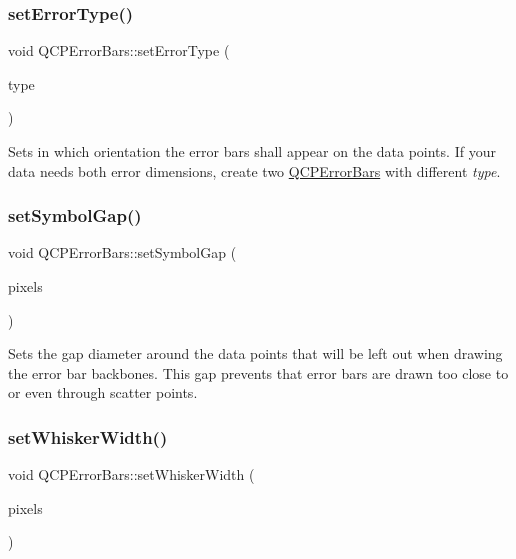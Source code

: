 \subsubsection{\texorpdfstring{set\+Error\+Type()}{setErrorType()}}
{\footnotesize\ttfamily void Q\+C\+P\+Error\+Bars\+::set\+Error\+Type (\begin{DoxyParamCaption}\item[{\hyperlink{class_q_c_p_error_bars_a95f0220f11a72648b96480a85ce26474}{Error\+Type}}]{type }\end{DoxyParamCaption})}

Sets in which orientation the error bars shall appear on the data points. If your data needs both error dimensions, create two \hyperlink{class_q_c_p_error_bars}{Q\+C\+P\+Error\+Bars} with different {\itshape type}. \mbox{\label{class_q_c_p_error_bars_a280ee8d863d8a2630c309701d019b3de}} 
\subsubsection{\texorpdfstring{set\+Symbol\+Gap()}{setSymbolGap()}}
{\footnotesize\ttfamily void Q\+C\+P\+Error\+Bars\+::set\+Symbol\+Gap (\begin{DoxyParamCaption}\item[{double}]{pixels }\end{DoxyParamCaption})}

Sets the gap diameter around the data points that will be left out when drawing the error bar backbones. This gap prevents that error bars are drawn too close to or even through scatter points. \mbox{\label{class_q_c_p_error_bars_ad05f6ff9e46c6047f1cd2459744b7b59}} 
\subsubsection{\texorpdfstring{set\+Whisker\+Width()}{setWhiskerWidth()}}
{\footnotesize\ttfamily void Q\+C\+P\+Error\+Bars\+::set\+Whisker\+Width (\begin{DoxyParamCaption}\item[{double}]{pixels }\end{DoxyParamCaption})}


